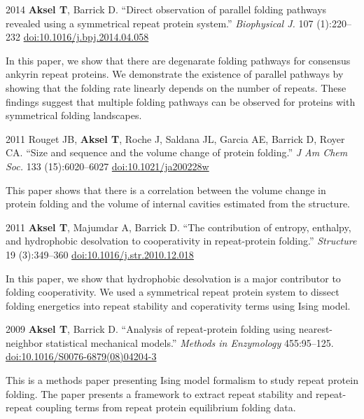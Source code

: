 \documentclass[12pt,letterpaper]{report}
\begin{document}
\begin{tablist}
        \item[2014] \tab{}\textbf{Aksel T}, Barrick D. \enquote{Direct observation of parallel folding pathways revealed using a symmetrical repeat protein system.} \textit{Biophysical J.} 107 (1):220--232 \href{https://doi.org/10.1016/j.bpj.2014.04.058}{doi:10.1016/j.bpj.2014.04.058}

        \begin{addmargin}[1cm]{0cm}
            In this paper, we show that there are degenarate folding pathways for consensus ankyrin repeat proteins. We demonstrate the existence of parallel pathways by showing that the folding rate linearly depends on the number of repeats. These findings suggest that multiple folding pathways can be observed for proteins with symmetrical folding landscapes.
        \end{addmargin}

        \item[2011] \tab{}Rouget JB, \textbf{Aksel T}, Roche J, Saldana JL, Garcia AE, Barrick D, Royer CA. \enquote{Size and sequence and the volume change of protein folding.} \textit{J Am Chem Soc.} 133 (15):6020--6027 \href{https://doi.org/10.1021/ja200228w}{doi:10.1021/ja200228w}

        \begin{addmargin}[1cm]{0cm}
            This paper shows that there is a correlation between the volume change in protein folding and the volume of internal cavities estimated from the structure. 
        \end{addmargin}

        \item[2011] \tab{}\textbf{Aksel T}, Majumdar A, Barrick D. \enquote{The contribution of entropy, enthalpy, and hydrophobic desolvation to cooperativity in repeat-protein folding.} \textit{Structure} 19 (3):349--360 \href{https://doi.org/10.1016/j.str.2010.12.018}{doi:10.1016/j.str.2010.12.018}

        \begin{addmargin}[1cm]{0cm}
            In this paper, we show that hydrophobic desolvation is a major contributor to folding cooperativity. We used a symmetrical repeat protein system to dissect folding energetics into repeat stability and coperativity terms using Ising model.   
        \end{addmargin}

        \item[2009] \tab{}\textbf{Aksel T}, Barrick D. \enquote{Analysis of repeat-protein folding using nearest-neighbor statistical mechanical models.} \textit{Methods in Enzymology} 455:95--125. \href{https://doi.org/10.1016/S0076-6879(08)04204-3}{doi:10.1016/S0076-6879(08)04204-3}

         \begin{addmargin}[1cm]{0cm}
            This is a methods paper presenting Ising model formalism to study repeat protein folding. The paper presents a framework to extract repeat stability and repeat-repeat coupling terms from repeat protein equilibrium folding data.
         \end{addmargin}

    \end{tablist}
    
\end{document}
